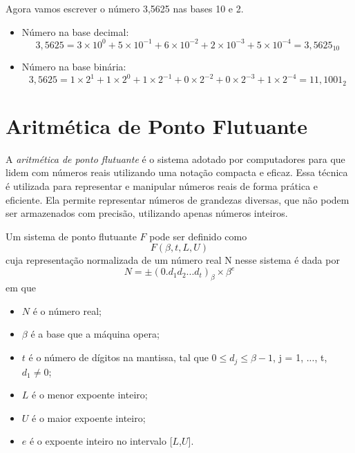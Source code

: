 \begin{ex}
Agora vamos escrever o número 3,5625 nas bases 10 e 2.

\begin{itemize}
    \item Número na base decimal: 
    \[
    3{,}5625 = 3 \times 10^0 + 5 \times 10^{-1} + 6 \times 10^{-2} + 2 \times 10^{-3} + 5 \times 10^{-4} = 3{,}5625_{10}
    \]
    
    \item Número na base binária:
    \[
    3{,}5625 = 1\times 2^{1} + 1 \times 2^0 + 1 \times 2^{-1} + 0 \times 2^{-2} + 0 \times 2^{-3} + 1 \times 2^{-4} = 11{,}1001_2
    \]
\end{itemize}
\end{ex}

\section{Aritmética de Ponto Flutuante}

A \textit{aritmética de ponto flutuante} é o sistema adotado por computadores para que lidem com números reais utilizando uma notação compacta e eficaz. Essa técnica é utilizada para representar e manipular números reais de forma prática e eficiente. Ela permite representar números de grandezas diversas, que não podem ser armazenados com precisão, utilizando apenas números inteiros.


Um sistema de ponto flutuante $F$ pode ser definido como
\[
F(\beta, t, L, U)\]
cuja representação normalizada de um número real N nesse sistema é dada por
\begin{equation}
N = \pm (0.d_{1}d_{2} . . . d_{t})_\beta \times \beta^e 
\end{equation}
em que
\begin{itemize}
  \item \( N \) é o número real;
  \item \(\beta\) é a base que a máquina opera;
  \item \( t \) é o número de dígitos na mantissa, tal que \( 0 \leq d_{j} \leq \beta-1 \), j = 1, ..., t, \(d_{1} \neq 0\);
  \item \( L \) é o menor expoente inteiro;
  \item \( U \) é o maior expoente inteiro;
  \item \( e \) é o expoente inteiro no intervalo [\( L \),\( U \)].
\end{itemize}


